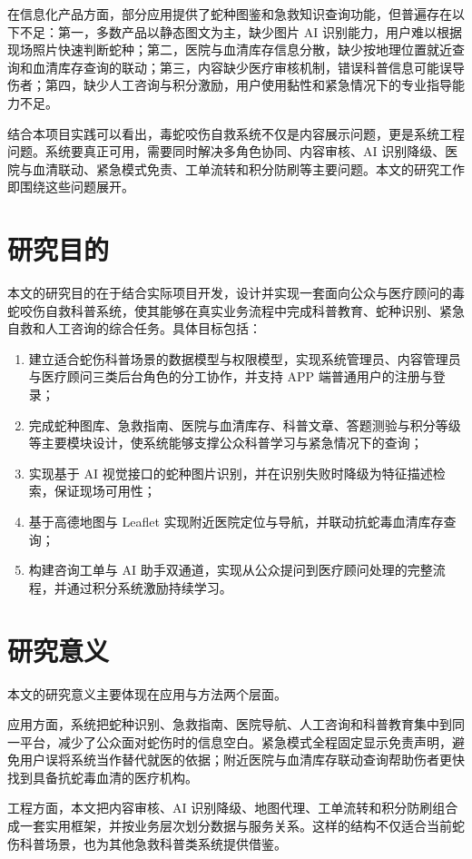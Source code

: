 \documentclass[12pt, a4paper, oneside]{ctexrep}
\begin{document}
在信息化产品方面，部分应用提供了蛇种图鉴和急救知识查询功能，但普遍存在以下不足：第一，多数产品以静态图文为主，缺少图片 AI 识别能力，用户难以根据现场照片快速判断蛇种；第二，医院与血清库存信息分散，缺少按地理位置就近查询和血清库存查询的联动；第三，内容缺少医疗审核机制，错误科普信息可能误导伤者；第四，缺少人工咨询与积分激励，用户使用黏性和紧急情况下的专业指导能力不足。

结合本项目实践可以看出，毒蛇咬伤自救系统不仅是内容展示问题，更是系统工程问题。系统要真正可用，需要同时解决多角色协同、内容审核、AI 识别降级、医院与血清联动、紧急模式免责、工单流转和积分防刷等主要问题。本文的研究工作即围绕这些问题展开。

\section{研究目的}
本文的研究目的在于结合实际项目开发，设计并实现一套面向公众与医疗顾问的毒蛇咬伤自救科普系统，使其能够在真实业务流程中完成科普教育、蛇种识别、紧急自救和人工咨询的综合任务。具体目标包括：

\begin{enumerate}
  \item 建立适合蛇伤科普场景的数据模型与权限模型，实现系统管理员、内容管理员与医疗顾问三类后台角色的分工协作，并支持 APP 端普通用户的注册与登录；
  \item 完成蛇种图库、急救指南、医院与血清库存、科普文章、答题测验与积分等级等主要模块设计，使系统能够支撑公众科普学习与紧急情况下的查询；
  \item 实现基于 AI 视觉接口的蛇种图片识别，并在识别失败时降级为特征描述检索，保证现场可用性；
  \item 基于高德地图与 Leaflet 实现附近医院定位与导航，并联动抗蛇毒血清库存查询；
  \item 构建咨询工单与 AI 助手双通道，实现从公众提问到医疗顾问处理的完整流程，并通过积分系统激励持续学习。
\end{enumerate}

\section{研究意义}
本文的研究意义主要体现在应用与方法两个层面。

应用方面，系统把蛇种识别、急救指南、医院导航、人工咨询和科普教育集中到同一平台，减少了公众面对蛇伤时的信息空白。紧急模式全程固定显示免责声明，避免用户误将系统当作替代就医的依据；附近医院与血清库存联动查询帮助伤者更快找到具备抗蛇毒血清的医疗机构。

工程方面，本文把内容审核、AI 识别降级、地图代理、工单流转和积分防刷组合成一套实用框架，并按业务层次划分数据与服务关系。这样的结构不仅适合当前蛇伤科普场景，也为其他急救科普类系统提供借鉴。
\end{document}

